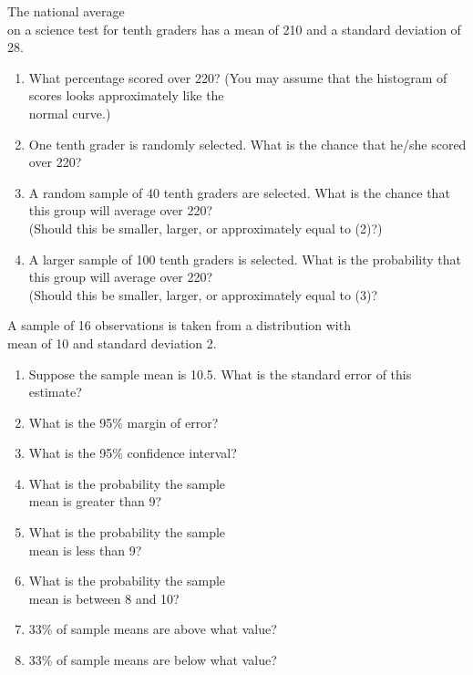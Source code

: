 \documentclass[11pt]{book}\usepackage[]{graphicx}\usepackage[]{color}
\begin{document}
\begin{exercises}
\begin{exercise}  %

The national average \\ on a science test for tenth graders has a mean of 210 and a standard deviation of 28.

\begin{enumerate}
  \item What percentage scored over 220?  (You may assume that the histogram of \\ scores looks approximately like the \\ normal  curve.)
  \item One tenth grader is randomly selected.  What is the chance that he/she scored over 220?
  \item A random sample of 40 tenth graders are selected.  What is the chance that this group will average over 220? \\ (Should this be smaller, larger, or approximately equal to (2)?)
  \item A larger sample of 100 tenth graders is selected.  What is the probability that this group will average over 220?  \\ (Should this be smaller, larger, or approximately equal to (3)?
\end{enumerate}

\end{exercise}
\begin{solution}  %

\end{solution}

\begin{exercise}  %

A sample of 16 observations is taken from a distribution with \\ mean of 10 and standard deviation 2.

\begin{enumerate}
  \item Suppose the sample mean is 10.5. What is the standard error of this estimate?
  \item What is the 95\% margin of error?
  \item What is the 95\% confidence interval?
  \item What is the probability the sample \\ mean is greater than 9?
  \item What is the probability the sample \\ mean is less than 9? 
  \item What is the probability the sample \\ mean is between 8 and 10? 
  \item 33\% of sample means are above what value? 
  \item 33\% of sample means are below what value?
\end{enumerate}
\end{exercise}
\begin{solution}  %


\end{solution}
\end{exercises}
\end{document}
